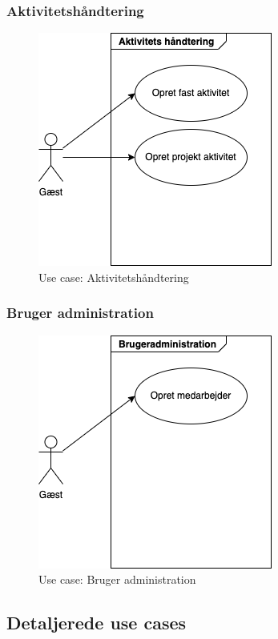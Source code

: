\subsubsection{Aktivitetshåndtering}

\begin{figure}[H]
    \centering
    \caption{Use case: Aktivitetshåndtering}\label{fig:Aktivitetshaandtering}
    \includegraphics[width=.3\textwidth]{Diagrams/guest_activity}
\end{figure}

\subsubsection{Bruger administration}

\begin{figure}[H]
    \centering
    \caption{Use case: Bruger administration}\label{fig:BrugerAdmin}
    \includegraphics[width=.3\textwidth]{Diagrams/guest_users}
\end{figure}

\subsection{Detaljerede use cases}
